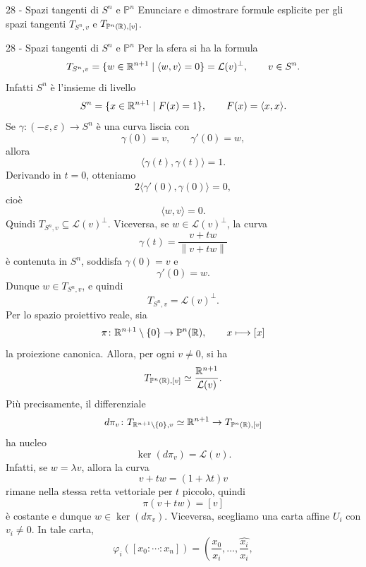 \documentclass[a4paper]{article}
\begin{document}
\begin{snippetexercise}{28 - Spazi tangenti di \(S^n\) e \(\mathbb{P}^n\)}
    Enunciare e dimostrare formule esplicite per gli spazi tangenti
    \(T_{S^n, v}\) e \(T_{\mathbb{P}^n(\mathbb{R}), [v]}\).
\end{snippetexercise}

\begin{snippetsolution}{28 - Spazi tangenti di \(S^n\) e \(\mathbb{P}^n\)}
    Per la sfera si ha la formula
    \[
        T_{S^n,v}
        =
        \{w\in\mathbb{R}^{n+1}\mid \langle w,v\rangle=0\}
        =
        \mathcal{L}(v)^\perp,
        \qquad v\in S^n.
    \]
    Infatti \(S^n\) è l'insieme di livello
    \[
        S^n=\{x\in\mathbb{R}^{n+1}\mid F(x)=1\},
        \qquad
        F(x)=\langle x,x\rangle.
    \]
    Se \(\gamma\colon(-\varepsilon,\varepsilon)\to S^n\) è una curva liscia con
    \[
        \gamma(0)=v,
        \qquad
        \gamma'(0)=w,
    \]
    allora
    \[
        \langle\gamma(t),\gamma(t)\rangle=1.
    \]
    Derivando in \(t=0\), otteniamo
    \[
        2\langle\gamma'(0),\gamma(0)\rangle=0,
    \]
    cioè
    \[
        \langle w,v\rangle=0.
    \]
    Quindi \(T_{S^n,v}\subseteq\mathcal{L}(v)^\perp\). Viceversa, se \(w\in\mathcal{L}(v)^\perp\), la curva
    \[
        \gamma(t)=\frac{v+tw}{\left\|v+tw\right\|}
    \]
    è contenuta in \(S^n\), soddisfa \(\gamma(0)=v\) e
    \[
        \gamma'(0)=w.
    \]
    Dunque \(w\in T_{S^n,v}\), e quindi
    \[
        T_{S^n,v}=\mathcal{L}(v)^\perp.
    \]
    Per lo spazio proiettivo reale, sia
    \[
        \pi\colon\mathbb{R}^{n+1}\setminus\{0\}\to\mathbb{P}^n(\mathbb{R}),
        \qquad
        x\longmapsto [x]
    \]
    la proiezione canonica. Allora, per ogni \(v\neq0\), si ha
    \[
        T_{\mathbb{P}^n(\mathbb{R}),[v]}
        \simeq
        \frac{\mathbb{R}^{n+1}}{\mathcal{L}(v)}.
    \]
    Più precisamente, il differenziale
    \[
        d\pi_v\colon T_{\mathbb{R}^{n+1}\setminus\{0\},v}\simeq\mathbb{R}^{n+1}\to T_{\mathbb{P}^n(\mathbb{R}),[v]}
    \]
    ha nucleo
    \[
        \ker(d\pi_v)=\mathcal{L}(v).
    \]
    Infatti, se \(w=\lambda v\), allora la curva
    \[
        v+tw=(1+\lambda t)v
    \]
    rimane nella stessa retta vettoriale per \(t\) piccolo, quindi
    \[
        \pi(v+tw)=[v]
    \]
    è costante e dunque \(w\in\ker(d\pi_v)\).
    Viceversa, scegliamo una carta affine \(U_i\) con \(v_i\neq0\). In tale carta,
    \[
        \varphi_i([x_0:\cdots:x_n])
        =
        \left(
            \frac{x_0}{x_i},
            \dots,
            \widehat{\frac{x_i}{x_i}},
\]
\end{snippetsolution}
\end{document}
